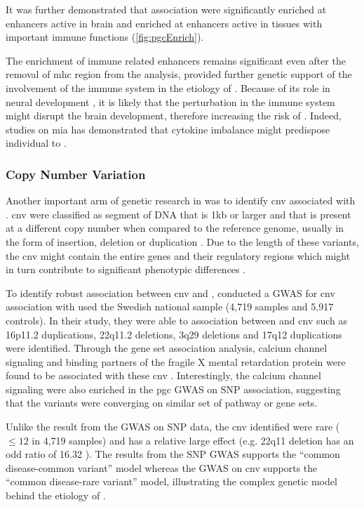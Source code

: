 	It was further demonstrated that  association were significantly enriched at enhancers active in brain and enriched at enhancers active in tissues with important immune functions (\cref{fig:pgcEnrich})\citep{Ripke2014}.
		
	The enrichment of immune related enhancers remains significant even after the removal of \gls{mhc} region from the analysis, provided further genetic support of the involvement of the immune system in the etiology of .
	Because of its role in neural development \citep{Zhao1998,Deverman2009}, it is likely that the perturbation in the immune system might disrupt the brain development, therefore increasing the risk of .
	Indeed, studies on \gls{mia} has demonstrated that cytokine imbalance might predispose individual to  \citep{Meyer2009}. 
	
	\subsubsection{Copy Number Variation}
	Another important arm of genetic research in  was to identify \gls{cnv} associated with .
	\gls{cnv} were classified as segment of DNA that is 1kb or larger and that is present at a different copy number when compared to the reference genome, usually in the form of insertion, deletion or duplication \citep{Feuk2006}.
	Due to the length of these variants, the \gls{cnv} might contain the entire genes and their regulatory regions which might in turn contribute to significant phenotypic differences \citep{Feuk2006}.
	
	To identify robust association between \gls{cnv} and , \citet{Szatkiewicz2014} conducted a \gls{GWAS} for \gls{cnv} association with  used the Swedish national sample (4,719  samples and 5,917 controls).
	In their study, they were able to association between  and \gls{cnv} such as 16p11.2 duplications, 22q11.2 deletions, 3q29 deletions and 17q12 duplications were identified.
	Through the gene set association analysis, calcium channel signaling and binding partners of the fragile X mental retardation protein were found to be associated with these \gls{cnv} \citep{Szatkiewicz2014}.
	Interestingly, the calcium channel signaling were also enriched in the \gls{pgc} \gls{GWAS} on \gls{SNP} association, suggesting that the variants were converging on similar set of pathway or gene sets. 
	
	Unlike the result from the \gls{GWAS} on \gls{SNP} data, the \gls{cnv} identified were rare ($\le12$ in 4,719 samples) and has a relative large effect (e.g. 22q11 deletion has an odd ratio of 16.32 \citep{Szatkiewicz2014}). 
	The results from the \gls{SNP} \gls{GWAS} supports the ``common disease-common variant'' model whereas the \gls{GWAS} on \gls{cnv} supports the ``common disease-rare variant'' model, illustrating the complex genetic model behind the etiology of .
	

	